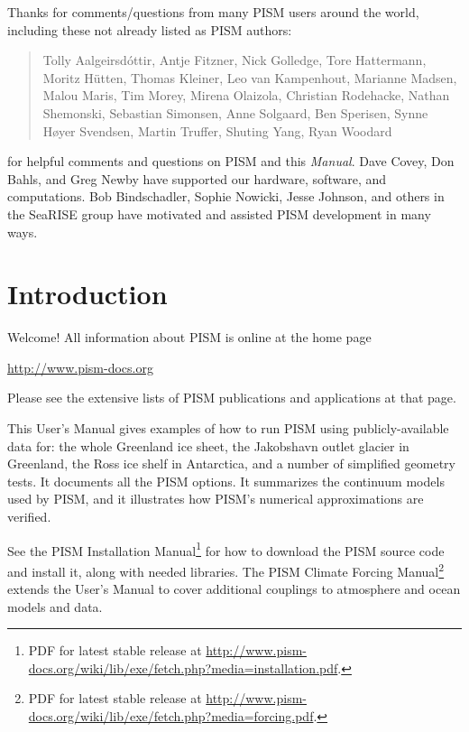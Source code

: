\documentclass[titlepage,letterpaper,final]{scrartcl}
\begin{document}
Thanks for comments/questions from many PISM users around the world, including these not already listed as PISM authors:

\begin{quote}
Tolly A{\dh}algeirsd{\'o}ttir, Antje Fitzner, Nick Golledge, Tore Hattermann, Moritz H\"utten, Thomas Kleiner, Leo van Kampenhout, Marianne Madsen, Malou Maris, Tim Morey, Mirena Olaizola, Christian Rodehacke, Nathan Shemonski, Sebastian Simonsen, Anne Solgaard, Ben Sperisen, Synne H\o{}yer Svendsen, Martin Truffer, Shuting Yang, Ryan Woodard
\end{quote}

\noindent for helpful comments and questions on PISM and this \emph{Manual}.  Dave Covey, Don Bahls, and Greg Newby have supported our hardware, software, and computations.  Bob Bindschadler, Sophie Nowicki, Jesse Johnson, and others in the SeaRISE group have motivated and assisted PISM development in many ways.

\normalsize



\newpage
\setcounter{tocdepth}{3}
\small
\tableofcontents
\normalsize

\newpage


\section{Introduction}\label{sec:intro}

Welcome!  All information about PISM is online at the home page
\begin{center}
  \url{http://www.pism-docs.org}
\end{center}
Please see the extensive lists of PISM publications and applications at that page.

This User's Manual gives examples of how to run PISM using publicly-available data for: the whole Greenland ice sheet, the Jakobshavn outlet glacier in Greenland, the Ross ice shelf in Antarctica, and a number of simplified geometry tests.  It documents all the PISM options.  It summarizes the continuum models used by PISM, and it illustrates how PISM's numerical approximations are verified.

See the PISM Installation Manual\footnote{PDF for latest stable release at \url{http://www.pism-docs.org/wiki/lib/exe/fetch.php?media=installation.pdf}.}
for how to download the PISM source code and install
it, along with needed libraries.  The PISM Climate Forcing
Manual\footnote{PDF for latest stable release at \url{http://www.pism-docs.org/wiki/lib/exe/fetch.php?media=forcing.pdf}.}
extends the User's Manual to cover additional couplings to atmosphere and ocean
models and data.
\end{document}
